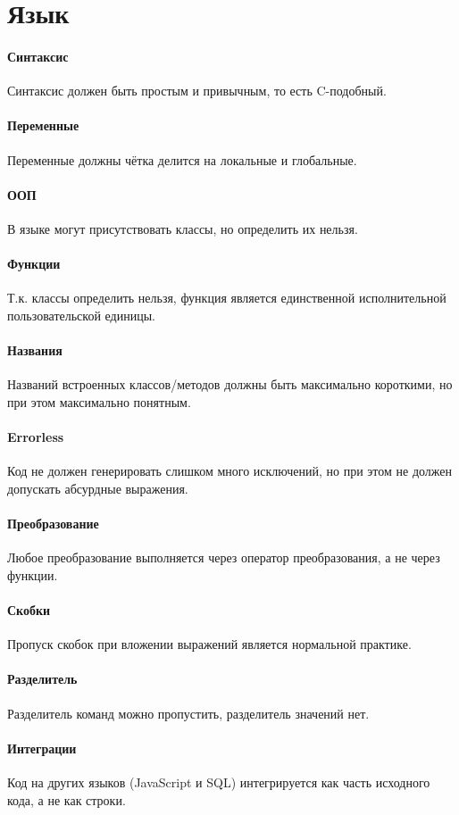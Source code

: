 \section{Язык}

\paragraph{Синтаксис}

Синтаксис должен быть простым и привычным, то есть C-подобный.

\paragraph{Переменные}

Переменные должны чётка делится на локальные и глобальные.

\paragraph{ООП}

В языке могут присутствовать классы, но определить их нельзя.

\paragraph{Функции}

Т.к. классы определить нельзя, функция является единственной исполнительной пользовательской единицы.

\paragraph{Названия}

Названий встроенных классов/методов должны быть максимально короткими, но при этом максимально понятным.

\paragraph{Errorless}

Код не должен генерировать слишком много исключений, но при этом не должен допускать абсурдные выражения.

\paragraph{Преобразование}

Любое преобразование выполняется через оператор преобразования, а не через функции.

\paragraph{Скобки}

Пропуск скобок при вложении выражений является нормальной практике.

\paragraph{Разделитель}

Разделитель команд можно пропустить, разделитель значений нет.

\paragraph{Интеграции}

Код на других языков (JavaScript и SQL) интегрируется как часть исходного кода, а не как строки.